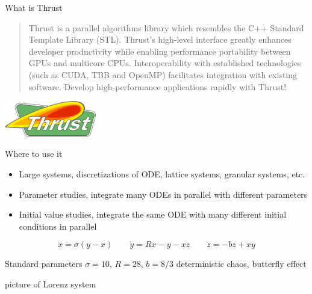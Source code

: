 \begin{frame}[fragile]


What is Thrust
\begin{quotation}
Thrust is a parallel algorithms library which resembles the C++ Standard Template Library (STL). Thrust's high-level interface greatly enhances developer productivity while enabling performance portability between GPUs and multicore CPUs. Interoperability with established technologies (such as CUDA, TBB and OpenMP) facilitates integration with existing software. Develop high-performance applications rapidly with Thrust!
\end{quotation}


\includegraphics[draft=false,width=0.3\textwidth]{thrust_logo.png}
 

\end{frame}


\begin{frame}[fragile]
 

Where to use it
\begin{itemize}
 \item Large systems, discretizations of ODE, lattice systems, granular systems, etc.
 \item Parameter studies, integrate many ODEs in parallel with different parameters
 \item Initial value studies, integrate the same ODE with many different initial conditions in parallel
\end{itemize}


\end{frame}



\begin{frame}[fragile]

 \begin{equation}
  \dot{x} = \sigma ( y - x ) \quad \quad \dot{y} = R x - y - x z \quad \quad \dot{z} = -b z + x y
 \end{equation}

Standard parameters $\sigma=10$, $R=28$, $b=8/3$ deterministic chaos, butterfly effect

picture of Lorenz system

\end{frame}



